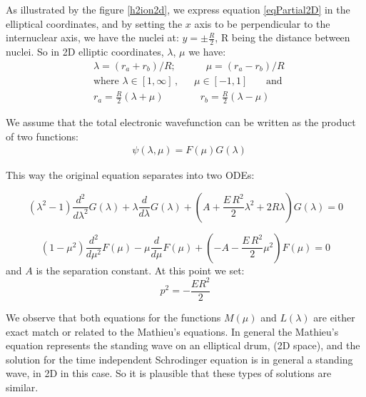 As illustrated by the figure  \ref{h2ion2d}, we express equation \eqref{eqPartial2D} in the elliptical coordinates, and by setting the $ x $ axis to be perpendicular to the internuclear axis, we have the nuclei at: $ y = \pm \frac{R}{2}  $, R being the distance between nuclei. So in  2D elliptic coordinates, $ \lambda $, $ \mu $ we have:
\begin{equation}\label{variables1}
\begin{split}
& \lambda = \left(r_a + r_b\right)/R;\,\,\,\,\,\,\,\,\,\,\,\,\,\,\,\,\,\,\mu =  \left(r_a - r_b\right)/R  \\[1em]
& \text{where } \lambda \in \left[1,\infty\right]\,,\,\,\,\,\,\,\,\,\,\mu \in \left[ -1, 1 \right]\,\,\,\,\,\,\,\,\,\text{ and } \\[.8em] 
& r_a = \frac{R}{2}\left(\lambda + \mu \right)\,\,\,\,\,\,\,\,\,\,\,\,\,\,\,\,\,\,\,\,\,\, r_b = \frac{R}{2}\left(\lambda - \mu \right)
\end{split}
\end{equation}

We assume that the total electronic wavefunction can be written as the product of two functions:
\begin{equation}\label{variables2}
\begin{split}
& \psi(\lambda,\mu) = F(\mu)G(\lambda)
\end{split}
\end{equation}

This way the original equation separates into two ODEs:

\begin{equation}\label{L2-1}
\left(\lambda^2 - 1 \right) \frac{d^2}{ d\lambda^2 }G(\lambda) + \lambda\frac{ d}{d\lambda }G (\lambda)  + \left(A + \frac{E\,R^2}{2}\lambda^2 + 2R\lambda  \right)G (\lambda) = 0  
\end{equation}

\begin{equation}
 \left(1 - \mu^2 \right) \frac{d^2}{ d\mu^2 }F(\mu) - \mu\frac{ d }{d\mu }F(\mu) +  \left(-A -  \frac{E\,R^2}{2}\mu^2  \right)F(\mu) = 0
\end{equation}
and $ A $ is the separation constant. At this point we set:
\begin{equation}
p^2 = -\frac{ER^2}{2}
\end{equation}

We observe that both equations for the functions $ M(\mu) $ and $ L(\lambda) $ are either exact match or related to the Mathieu's equations. In general the Mathieu's equation represents the standing wave on an elliptical drum, (2D space), and the solution for the time independent Schrodinger equation is in general a standing wave, in 2D in this case. So it is plausible that these types of solutions are similar.


